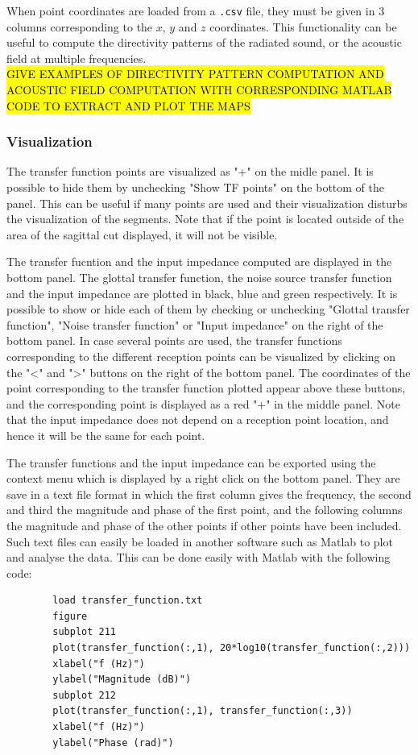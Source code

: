 \documentclass[]{article}
\begin{document}
	When point coordinates are loaded from a \texttt{.csv} file, they must be given
	in 3 columns corresponding to the $x$, $y$ and $z$ coordinates. 
	This functionality can be useful to compute the directivity patterns of the 
	radiated sound, or the acoustic field at multiple frequencies.
	\\ \hl{GIVE EXAMPLES OF DIRECTIVITY PATTERN COMPUTATION AND ACOUSTIC 
		FIELD COMPUTATION WITH CORRESPONDING MATLAB CODE TO EXTRACT AND PLOT 
		THE MAPS} \\
	
	\subsubsection{Visualization}
	
	The transfer function points are visualized as "+" on the midle panel.
	It is possible to hide them by unchecking "Show TF points" on the bottom of 
	the panel. This can be useful if many points are used and their visualization 
	disturbs the visualization of the segments.
	Note that if the point is located outside of the area of the sagittal cut displayed,
	it will not be visible.
	
	The transfer fucntion and the input impedance computed are displayed in the bottom panel.
	The glottal transfer function, the noise source transfer function and the input 
	impedance are plotted in black, blue and green respectively.
	It is possible to show or hide each of them by checking or unchecking 
	"Glottal transfer function", "Noise transfer function" or "Input impedance" on the 
	right of the bottom panel. 
	In case several points are used, 
	the transfer functions corresponding to the different reception points can be visualized
	by clicking on the "<" and ">" buttons on the right of the bottom panel.
	The coordinates of the point corresponding to the transfer function plotted appear above 
	these buttons, and the corresponding point is displayed as a red "+" in the middle panel.
	Note that the input impedance does not depend on a reception point location, and hence
	it will be the same for each point.
	
	The transfer functions and the input impedance can be exported using the context 
	menu which is displayed by a right click on the bottom panel. 
	They are save in a text file format in which the first column gives the frequency, 
	the second and third the magnitude and phase of the first point, and the following 
	columns the magnitude and phase of the other points if other points have been included.
	Such text files can easily be loaded in another software such as Matlab to plot and 
	analyse the data.
	This can be done easily with Matlab with the following code:
	\begin{lstlisting}
		load transfer_function.txt
		figure
		subplot 211
		plot(transfer_function(:,1), 20*log10(transfer_function(:,2)))
		xlabel("f (Hz)")
		ylabel("Magnitude (dB)")
		subplot 212
		plot(transfer_function(:,1), transfer_function(:,3))
		xlabel("f (Hz)")
		ylabel("Phase (rad)")
	\end{lstlisting}
	
\end{document}
